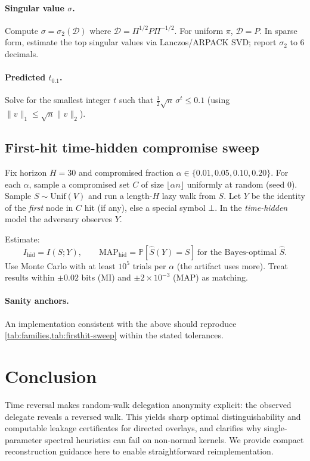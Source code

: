 \documentclass[11pt]{article}
\newcommand{\Prb}{\mathbb{P}}
\newcommand{\Unif}{\mathrm{Unif}}
\newcommand{\cD}{\mathcal{D}}
\begin{document}
\paragraph{Singular value $\sigma$.}
Compute $\sigma=\sigma_2(\cD)$ where $\cD=\Pi^{1/2}P\Pi^{-1/2}$.
For uniform $\pi$, $\cD=P$. In sparse form, estimate the top singular values via
Lanczos/ARPACK SVD; report $\sigma_2$ to 6 decimals.

\paragraph{Predicted $t_{0.1}$.}
Solve for the smallest integer $t$ such that
$\tfrac12\sqrt{n}\,\sigma^{t}\le 0.1$ (using $\|v\|_1\le\sqrt{n}\|v\|_2$).

\subsection{First-hit time-hidden compromise sweep}
Fix horizon $H=30$ and compromised fraction $\alpha\in\{0.01,0.05,0.10,0.20\}$.
For each $\alpha$, sample a compromised set $C$ of size $\lfloor \alpha n\rfloor$
uniformly at random (seed 0). Sample $S\sim\Unif(V)$ and run a length-$H$ lazy
walk from $S$. Let $Y$ be the identity of the \emph{first} node in $C$ hit
(if any), else a special symbol $\bot$. In the \emph{time-hidden} model the
adversary observes $Y$.

Estimate:
\[
I_{\mathrm{hid}} = I(S;Y), \qquad
\mathrm{MAP}_{\mathrm{hid}} = \Prb[\hat S(Y)=S]\ \text{for the Bayes-optimal }\hat S.
\]
Use Monte Carlo with at least $10^5$ trials per $\alpha$ (the artifact uses more).
Treat results within $\pm 0.02$ bits (MI) and $\pm 2\times10^{-3}$ (MAP) as matching.

\paragraph{Sanity anchors.}
An implementation consistent with the above should reproduce
\cref{tab:families,tab:firsthit-sweep} within the stated tolerances.

\section{Conclusion}
Time reversal makes random-walk delegation anonymity explicit: the observed
delegate reveals a reversed walk. This yields sharp optimal distinguishability
and computable leakage certificates for directed overlays, and clarifies why
single-parameter spectral heuristics can fail on non-normal kernels. We provide
compact reconstruction guidance here to enable straightforward reimplementation.
\end{document}
